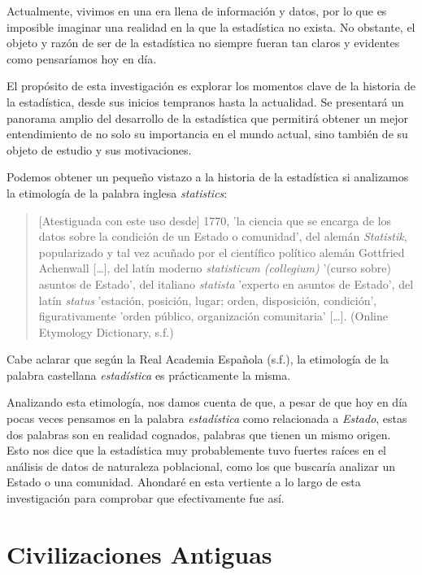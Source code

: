\documentclass[12pt, a4paper]{article}
\begin{document}
\sffamily
{}


Actualmente, vivimos en una era llena de información y datos, por lo que es imposible imaginar una realidad en la que la estadística no exista. No obstante, el objeto y razón de ser de la estadística no siempre fueran tan claros y evidentes como pensaríamos hoy en día.

El propósito de esta investigación es explorar los momentos clave de la historia de la estadística, desde sus inicios tempranos hasta la actualidad. Se presentará un panorama amplio del desarrollo de la estadística que permitirá obtener un mejor entendimiento de no solo su importancia en el mundo actual, sino también de su objeto de estudio y sus motivaciones.

Podemos obtener un pequeño vistazo a la historia de la estadística si analizamos la etimología de la palabra inglesa \textit{statistics}:

\begin{quote}
	[Atestiguada con este uso desde] 1770, 'la ciencia que se encarga de los datos sobre la condición de un Estado o comunidad', del alemán \textit{Statistik}, popularizado y tal vez acuñado por el científico político alemán Gottfried Achenwall […], del latín moderno \textit{statisticum (collegium)} '(curso sobre) asuntos de Estado', del italiano \textit{statista} 'experto en asuntos de Estado', del latín \textit{status} 'estación, posición, lugar; orden, disposición, condición', figurativamente 'orden público, organización comunitaria' […]. (Online Etymology Dictionary, s.f.)
\end{quote}

Cabe aclarar que según la Real Academia Española (s.f.), la etimología de la palabra castellana \textit{estadística} es prácticamente la misma.

Analizando esta etimología, nos damos cuenta de que, a pesar de que hoy en día pocas veces pensamos en la palabra \textit{estadística} como relacionada a \textit{Estado}, estas dos palabras son en realidad cognados, palabras que tienen un mismo origen. Esto nos dice que la estadística muy probablemente tuvo fuertes raíces en el análisis de datos de naturaleza poblacional, como los que buscaría analizar un Estado o una comunidad. Ahondaré en esta vertiente a lo largo de esta investigación para comprobar que efectivamente fue así.

\section{Civilizaciones Antiguas}
\end{document}

